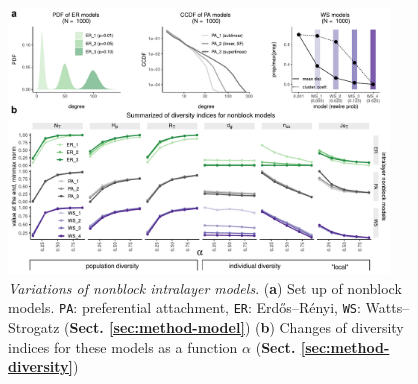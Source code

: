 \begin{figure}[!ht]
    \centering
    \includegraphics[width=0.9\textwidth]{figures/FigS1.pdf}
    \caption{
    \textit{Variations of nonblock intralayer models}.
    (\textbf{a}) Set up of nonblock models. \texttt{PA}: preferential attachment, \texttt{ER}: Erdős–Rényi, \texttt{WS}: Watts–Strogatz (\textbf{Sect. \ref{sec:method-model}})
    (\textbf{b}) Changes of diversity indices for these models as a function $\alpha$ (\textbf{Sect. \ref{sec:method-diversity}})
    }
    \label{supp:1}
\end{figure}